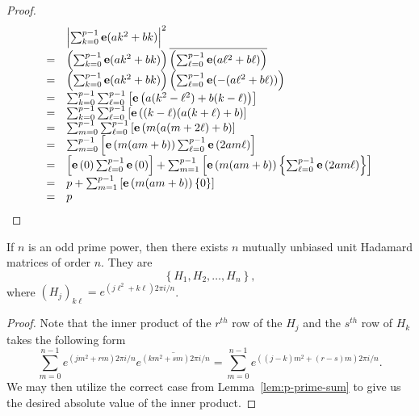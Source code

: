 \begin{lemma}
\begin{proof}
  $$\begin{array}{rl}
      & \left|\sum_{k=0}^{p-1} {\bf e}(ak^2 + bk)\right|^2 \\
    = & \left(\sum_{k=0}^{p-1} {\bf e}(ak^2 + bk)\right)\overline{\left(\sum_{\ell=0}^{p-1} {\bf e}(a\ell^2 + b\ell)\right)} \\
    = & \left(\sum_{k=0}^{p-1} {\bf e}(ak^2 + bk)\right)\left(\sum_{\ell=0}^{p-1} {\bf e}(-(a\ell^2 + b\ell))\right)\\
    = & \sum_{k=0}^{p-1} \sum_{\ell=0}^{p-1} \left[{\bf e}\left(a(k^2-\ell^2) + b(k-\ell)\right)\right]\\
    = & \sum_{k=0}^{p-1} \sum_{\ell=0}^{p-1} \left[{\bf e}\left((k-\ell)(a(k+\ell) + b\right)\right]\\
    = & \sum_{m=0}^{p-1} \sum_{\ell=0}^{p-1} \left[{\bf e}\left(m(a(m+2\ell) + b\right)\right]\\
    = & \sum_{m=0}^{p-1} \left[{\bf e}\left(m(am+b)\right)\sum_{\ell=0}^{p-1} {\bf e}\left(2am\ell\right)\right]\\
    = & \left[{\bf e}\left(0\right)\sum_{\ell=0}^{p-1} {\bf e}\left(0\right)\right] + \sum_{m=1}^{p-1} \left[{\bf e}\left(m(am+b)\right)\left\{\sum_{\ell=0}^{p-1} {\bf e}\left(2am\ell\right)\right\}\right]\\
    = & p + \sum_{m=1}^{p-1} \left[{\bf e}\left(m(am+b)\right)\left\{0\right\}\right]\\
    = & p
    \end{array}
$$
 \end{proof}

\end{lemma}

\begin{theorem}\label{th:pr-pow}
 If $n$ is an odd prime power, then there exists $n$ mutually unbiased unit Hadamard matrices of order $n$. They are $$\left\{H_1,H_2,\dots,H_n\right\},$$ where $(H_j)_{k\ell} = e^{(j\ell^2 + k\ell)2\pi i/n}$.
 \begin{proof}
  Note that the inner product of the $r^{th}$ row of the $H_{j}$ and the $s^{th}$ row of $H_{k}$ takes the following form
   $$ \sum_{m=0}^{n-1} e^{(jm^2 + rm){2\pi i}/{n}}\overline{e^{(km^2 + sm){2\pi i}/{n}}} = \sum_{m=0}^{n-1} e^{((j-k)m^2 + (r-s)m){2\pi i}/{n}}.$$ We may then utilize the correct case from Lemma~\ref{lem:p-prime-sum} to give us the desired absolute value of the inner product.
 \end{proof}

\end{theorem}

